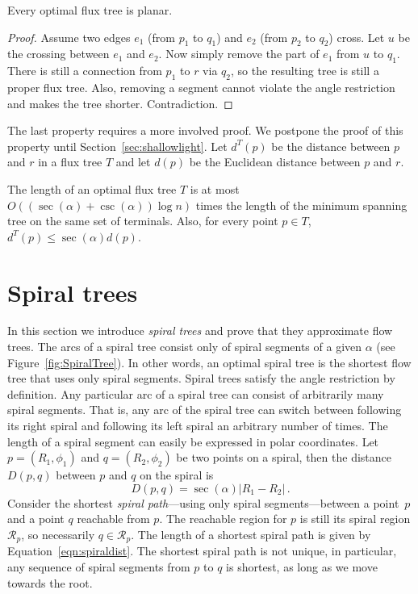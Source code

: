 \documentclass{journalA4}
\begin{document}
\begin{property}
\label{property:optplanar}
Every optimal flux tree is planar.
\end{property}
\begin{proof}
Assume two edges $e_1$ (from $p_1$ to $q_1$) and $e_2$ (from $p_2$ to $q_2$) cross. Let $u$ be the crossing between $e_1$ and $e_2$. Now simply remove the part of $e_1$ from $u$ to $q_1$. There is still a connection from $p_1$ to $r$ via $q_2$, so the resulting tree is still a proper flux tree. Also, removing a segment cannot violate the angle restriction and makes the tree shorter. Contradiction.
\end{proof}
The last property requires a more involved proof. We postpone the proof of this property until Section~\ref{sec:shallowlight}. Let $d^T(p)$ be the distance between $p$ and $r$ in a flux tree $T$ and let $d(p)$ be the Euclidean distance between $p$ and $r$.
\begin{property}
\label{property:shallowlight} The length of an optimal flux tree $T$ is at most $O((\sec(\alpha) + \csc(\alpha)) \log n)$ times the length of the minimum spanning tree on the same
set of terminals. Also, for every point $p \in T$, $d^T(p) \leq \sec(\alpha) d(p)$.
\end{property}

\section{Spiral trees}\label{sec:spiraltrees}

In this section we introduce \emph{spiral trees} and prove that they approximate flow trees. The arcs of a spiral tree consist only of spiral segments of a given $\alpha$ (see
Figure~\ref{fig:SpiralTree}). In other words, an optimal spiral tree is the shortest flow tree that uses only spiral segments. Spiral trees satisfy the angle restriction by
definition. Any particular arc of a spiral tree can consist of arbitrarily many spiral segments. That is, any arc of the spiral tree can switch between following its right spiral
and following its left spiral an arbitrary number of times. The length of a spiral segment can easily be expressed in polar coordinates. Let $p = (R_1, \phi_1)$
and $q = (R_2, \phi_2)$ be two points on a spiral, then the distance $D(p, q)$ between $p$ and $q$ on the spiral is
\begin{equation}
\label{eqn:spiraldist}
D(p, q) = \sec(\alpha) |R_1 - R_2| \, .
\end{equation}
Consider the shortest \emph{spiral path}---using only spiral segments---between a point~$p$ and a point $q$ reachable from $p$. The reachable region for $p$ is still its spiral region $\mathcal{R}_p$, so necessarily $q \in \mathcal{R}_p$. The length of a shortest spiral path is given by Equation~\ref{eqn:spiraldist}. The shortest spiral path is not unique, in particular, any sequence of spiral segments from $p$ to $q$ is shortest, as long as we move towards the root.
\end{document}
